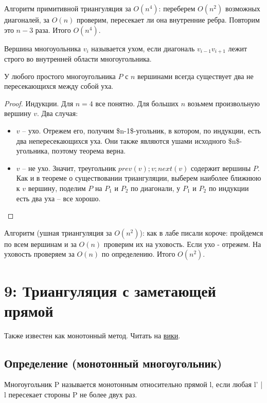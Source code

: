 \documentclass[11pt]{article}
\begin{document}
Алгоритм примитивной триангуляция за \(O(n^4)\): переберем \(O(n^2)\)
возможных диагоналей, за \(O(n)\) проверим, пересекает ли она
внутренние ребра. Повторим это \(n-3\) раза. Итого \(O(n^4)\).

\begin{defn}[ухо]
Вершина многоуольника \(v_i\) называется ухом, если диагональ
\(v_{i-1}v_{i+1}\) лежит строго во внутренней области многоугольника.
\end{defn}

\begin{thm}
У любого простого многоугольника \(P\) с \(n\) вершинами всегда
существует два не пересекающихся между собой уха.
\end{thm}

\begin{proof}
Индукции. Для \(n=4\) все понятно. Для больших \(n\)
возьмем произвольную вершину \(v\). Два случая:
\begin{itemize}
\item \(v\) \--- ухо. Отрежем его, получим \$n-1\$-угольник, в котором, по
индукции, есть два непересекающихся уха. Они также являются ушами
исходного \$n\$-угольника, поэтому теорема верна.
\item \(v\) \--- не ухо. Значит, треугольник \(prev(v); v; next(v)\) содержит
вершины \(P\). Как и в теореме о существовании триангуляции,
выберем наиболее ближнюю к \(v\) вершину, поделим \(P\) на \(P_1\) и
\(P_2\) по диагонали, у \(P_1\) и \(P_2\) по индукции есть два уха \--- все
хорошо.
\end{itemize}
\end{proof}

Алгоритм (ушная триангуляция за \(O(n^2)\)): как в лабе писали
короче: пройдемся по всем вершинам и за \(O(n)\) проверим их на
уховость. Если ухо - отрежем.  На уховость проверяем за \(O(n)\) по
определению. Итого \(O(n^2)\).
\section{{\bfseries{}} 9:  Триангуляция с заметающей прямой}
\label{sec:orgheadline39}
Также известен как монотонный метод. Читать на \href{http://neerc.ifmo.ru/wiki/index.php?title=Триангуляция_полигонов_(ушная_\%2B_монотонная)#.D0.9C.D0.BE.D0.BD.D0.BE.D1.82.D0.BE.D0.BD.D0.BD.D1.8B.D0.B9_.D0.BC.D0.B5.D1.82.D0.BE.D0.B4}{вики}.

\subsection{Определение (монотонный многоугольник)}
\label{sec:orgheadline33}
Многоугольник P называется монотонным относительно прямой l, если любая l' \uline{|} l пересекает стороны P
не более двух раз.
\end{document}
